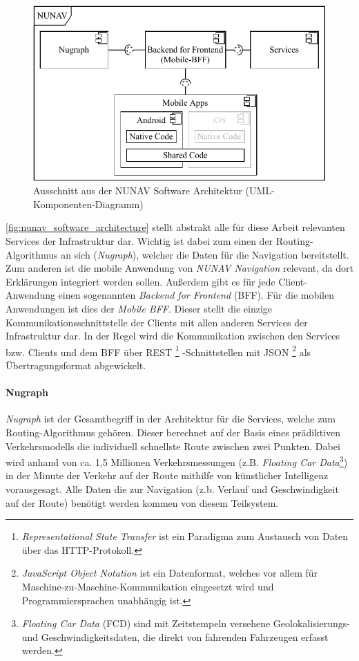\begin{figure}[htb!]
    \centering
    \includegraphics[width=\textwidth]{contents/06_model_evaluation/01_integration/res/nunav_architecture.pdf}
    \caption{Ausschnitt aus der NUNAV Software Architektur (UML-Komponenten-Diagramm)}
    \label{fig:nunav_software_architecture}
\end{figure}

\autoref{fig:nunav_software_architecture} stellt abstrakt alle für diese Arbeit relevanten Services der Infrastruktur dar. Wichtig ist dabei zum einen der Routing-Algorithmus an sich (\textit{Nugraph}), welcher die Daten für die Navigation bereitstellt. Zum anderen ist die mobile Anwendung von \textit{NUNAV Navigation} relevant, da dort Erklärungen integriert werden sollen. Außerdem gibt es für jede Client-Anwendung einen sogenannten \textit{Backend for Frontend} (BFF). Für die mobilen Anwendungen ist dies der \textit{Mobile BFF}. Dieser stellt die einzige Kommunikationsschnittstelle der Clients mit allen anderen Services der Infrastruktur dar. In der Regel wird die Kommunikation zwischen den Services bzw. Clients und dem BFF über REST
\footnote{\textit{Representational State Transfer} ist ein Paradigma zum Austausch von Daten über das HTTP-Protokoll.}
-Schnittstellen mit JSON
\footnote{\textit{JavaScript Object Notation} ist ein Datenformat, welches vor allem für Maschine-zu-Maschine-Kommunikation eingesetzt wird und Programmiersprachen unabhängig ist.}
als Übertragungsformat abgewickelt. 

\paragraph{Nugraph} \textit{Nugraph} ist der Gesamtbegriff in der Architektur für die Services, welche zum Routing-Algorithmus gehören. Dieser berechnet auf der Basis eines prädiktiven Verkehrsmodells die individuell schnellste Route zwischen zwei Punkten. Dabei wird anhand von ca. 1,5 Millionen Verkehrsmessungen
 (z.B. \textit{Floating Car Data}\footnote{\textit{Floating Car Data} (FCD) sind mit Zeitstempeln versehene Geolokalisierungs- und Geschwindigkeitsdaten, die direkt von fahrenden Fahrzeugen erfasst werden.})
 in der Minute der Verkehr auf der Route mithilfe von künstlicher Intelligenz vorausgesagt. Alle Daten die zur Navigation (z.b. Verlauf und Geschwindigkeit auf der Route) benötigt werden kommen von diesem Teilsystem.

